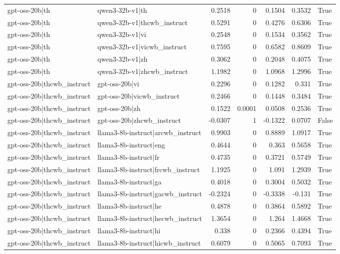 \begin{table}
\begin{tabular}{l l r r r r l}
gpt-oss-20b|th & qwen3-32b-v1|th & 0.2518 & 0 & 0.1504 & 0.3532 & True \\
gpt-oss-20b|th & qwen3-32b-v1|thcwb_instruct & 0.5291 & 0 & 0.4276 & 0.6306 & True \\
gpt-oss-20b|th & qwen3-32b-v1|vi & 0.2548 & 0 & 0.1534 & 0.3562 & True \\
gpt-oss-20b|th & qwen3-32b-v1|vicwb_instruct & 0.7595 & 0 & 0.6582 & 0.8609 & True \\
gpt-oss-20b|th & qwen3-32b-v1|zh & 0.3062 & 0 & 0.2048 & 0.4075 & True \\
gpt-oss-20b|th & qwen3-32b-v1|zhcwb_instruct & 1.1982 & 0 & 1.0968 & 1.2996 & True \\
gpt-oss-20b|thcwb_instruct & gpt-oss-20b|vi & 0.2296 & 0 & 0.1282 & 0.331 & True \\
gpt-oss-20b|thcwb_instruct & gpt-oss-20b|vicwb_instruct & 0.2466 & 0 & 0.1448 & 0.3484 & True \\
gpt-oss-20b|thcwb_instruct & gpt-oss-20b|zh & 0.1522 & 0.0001 & 0.0508 & 0.2536 & True \\
gpt-oss-20b|thcwb_instruct & gpt-oss-20b|zhcwb_instruct & -0.0307 & 1 & -0.1322 & 0.0707 & False \\
gpt-oss-20b|thcwb_instruct & llama3-8b-instruct|arcwb_instruct & 0.9903 & 0 & 0.8889 & 1.0917 & True \\
gpt-oss-20b|thcwb_instruct & llama3-8b-instruct|eng & 0.4644 & 0 & 0.363 & 0.5658 & True \\
gpt-oss-20b|thcwb_instruct & llama3-8b-instruct|fr & 0.4735 & 0 & 0.3721 & 0.5749 & True \\
gpt-oss-20b|thcwb_instruct & llama3-8b-instruct|frcwb_instruct & 1.1925 & 0 & 1.091 & 1.2939 & True \\
gpt-oss-20b|thcwb_instruct & llama3-8b-instruct|ga & 0.4018 & 0 & 0.3004 & 0.5032 & True \\
gpt-oss-20b|thcwb_instruct & llama3-8b-instruct|gacwb_instruct & -0.2324 & 0 & -0.3338 & -0.131 & True \\
gpt-oss-20b|thcwb_instruct & llama3-8b-instruct|he & 0.4878 & 0 & 0.3864 & 0.5892 & True \\
gpt-oss-20b|thcwb_instruct & llama3-8b-instruct|hecwb_instruct & 1.3654 & 0 & 1.264 & 1.4668 & True \\
gpt-oss-20b|thcwb_instruct & llama3-8b-instruct|hi & 0.338 & 0 & 0.2366 & 0.4394 & True \\
gpt-oss-20b|thcwb_instruct & llama3-8b-instruct|hicwb_instruct & 0.6079 & 0 & 0.5065 & 0.7093 & True \\

\end{tabular}
\end{table}
